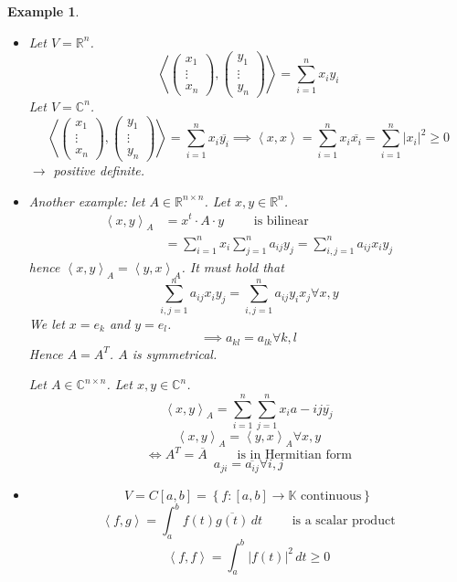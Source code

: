 \documentclass{article}
\newcounter{lecref}[section]
\numberwithin{lecref}{section}
\newtheorem{example}[lecref]{Example}
\newcommand{\set}[1]{\left\{#1\right\}}
\newcommand{\angel}[1]{\left\langle#1\right\rangle}
\newcommand{\card}[1]{\left|#1\right|}
\begin{document}
\begin{example} %
  \begin{itemize}
    \item 
      Let $V = \mathbb R^n$.
      \[
        \angel{\begin{pmatrix} x_1 \\ \vdots \\ x_n \end{pmatrix}, \begin{pmatrix} y_1 \\ \vdots \\ y_n \end{pmatrix}}
        = \sum_{i=1}^n x_i y_i
      \]
      Let $V = \mathbb C^n$.
      \[
        \angel{\begin{pmatrix} x_1 \\ \vdots \\ x_n \end{pmatrix}, \begin{pmatrix} y_1 \\ \vdots \\ y_n \end{pmatrix}}
        = \sum_{i=1}^n x_i \overline{y_i}
        \implies \angel{x, x} = \sum_{i=1}^n x_i \overline{x_i} = \sum_{i=1}^n \card{x_i}^2 \geq 0
      \]
      $\to$ positive definite.

    \item
      Another example: let $A \in \mathbb R^{n \times n}$.
      Let $x, y \in \mathbb R^n$.
      \begin{align*}
        \angel{x, y}_A &= x^t \cdot A \cdot y \qquad \text{ is bilinear} \\
          &= \sum_{i=1}^n x_i \sum_{j=1}^n a_{ij} y_j = \sum_{i,j=1}^n a_{ij} x_i y_j
      \end{align*}
      hence $\angel{x, y}_A = \angel{y, x}_A$.
      It must hold that
      \[ \sum_{i,j=1}^n a_{ij} x_i y_j = \sum_{i,j=1}^n a_{ij} y_i x_j \forall x,y \]
      We let $x = e_k$ and $y = e_l$.
      \[ \implies a_{kl} = a_{lk} \forall k,l \]
      Hence $A = A^T$. $A$ is symmetrical.

      Let $A \in \mathbb C^{n \times n}$. Let $x, y \in \mathbb C^n$.
      \[ \angel{x, y}_A = \sum_{i=1}^n \sum_{j=1}^n x_i a-{ij} \overline{y_j} \]
      \[ \angel{x,y}_A = \angel{y,x}_A \forall x,y \]
      \[ \iff A^T = \overline{A} \qquad \text{ is in Hermitian form} \]
      \[ a_{ji} = \overline{a_{ij}} \forall i ,j \]

    \item
      \[ V = C[a,b] = \set{f: [a,b] \to \mathbb K \text{ continuous}} \]
      \[ \angel{f,g} = \int_a^b f(t) \overline{g(t)} \, dt \qquad \text{ is a scalar product} \]
      \[ \angel{f,f} = \int_a^b \card{f(t)}^2 \, dt \geq 0 \]


\end{itemize}
\end{example}
\end{document}

